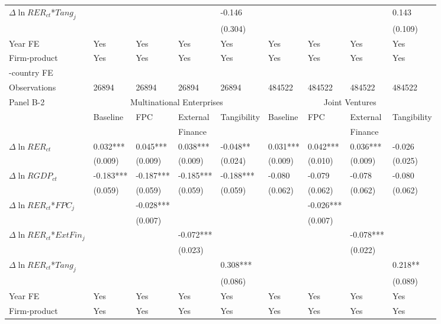 \documentclass[12pt]{article}
\begin{document}
\begin{table}[htbp]
{\begin{threeparttable}
\begin{tabular}{lllllllll}
		$\Delta \ln RER_{ct}$*$Tang_{j}$ &       &       &       & -0.146 &       &       &       & 0.143 \\
		&       &       &       & (0.304) &       &       &       & (0.109) \\
		Year FE  & Yes   & Yes   & Yes   & Yes   & Yes   & Yes   & Yes   & Yes \\
		Firm-product & Yes   & Yes   & Yes   & Yes   & Yes   & Yes   & Yes   & Yes \\
		-country FE &&&&&&&& \\
		Observations     & 26894 & 26894 & 26894 & 26894 & 484522 & 484522 & 484522 & 484522 \\
		\midrule
		Panel B-2 & \multicolumn{4}{c}{Multinational Enterprises} & \multicolumn{4}{c}{Joint Ventures} \\
		& Baseline & FPC   & External  & Tangibility & Baseline & FPC   & External  & Tangibility \\
		&  &   & Finance &  &  &   &  Finance &  \\
		\midrule
		$\Delta \ln RER_{ct}$ & 0.032*** & 0.045*** & 0.038*** & -0.048** & 0.031*** & 0.042*** & 0.036*** & -0.026 \\
		& (0.009) & (0.009) & (0.009) & (0.024) & (0.009) & (0.010) & (0.009) & (0.025) \\
		$\Delta \ln RGDP_{ct}$ & -0.183*** & -0.187*** & -0.185*** & -0.188*** & -0.080 & -0.079 & -0.078 & -0.080 \\
		& (0.059) & (0.059) & (0.059) & (0.059) & (0.062) & (0.062) & (0.062) & (0.062) \\
		$\Delta \ln RER_{ct}$*$FPC_{j}$ &       & -0.028*** &       &       &       & -0.026*** &       &  \\
		&       & (0.007) &       &       &       & (0.007) &       &  \\
		$\Delta \ln RER_{ct}$*$ExtFin_{j}$ &       &       & -0.072*** &       &       &       & -0.078*** &  \\
		&       &       & (0.023) &       &       &       & (0.022) &  \\
		$\Delta \ln RER_{ct}$*$Tang_{j}$ &       &       &       & 0.308*** &       &       &       & 0.218** \\
		&       &       &       & (0.086) &       &       &       & (0.089) \\
		Year FE  & Yes   & Yes   & Yes   & Yes   & Yes   & Yes   & Yes   & Yes \\
		Firm-product & Yes   & Yes   & Yes   & Yes   & Yes   & Yes   & Yes   & Yes \\

\end{tabular}
\end{threeparttable}}
\end{table}
\end{document}
